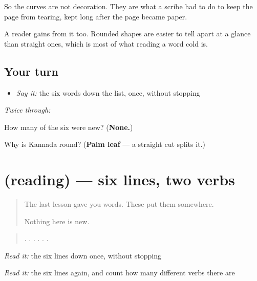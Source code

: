 So the curves are not decoration. They are what a scribe had to do to keep the page from tearing, kept long after the page became paper.

A reader gains from it too. Rounded shapes are easier to tell apart at a glance than straight ones, which is most of what reading a word cold is.

\subsection*{Your turn}
\begin{itemize}
\raggedright
  \item \emph{Say it:} the six words down the list, once, without stopping
\end{itemize}

\emph{Twice through:}

\begin{tcolorbox}[breakable,colback=teal!4,colframe=teal!35!black,title={Before you move on}]
How many of the six were new? (\textbf{None.})

Why is Kannada round? (\textbf{Palm leaf} — a straight cut splits it.)
\end{tcolorbox}
\section[(reading)]{(reading) — six lines, two verbs}

\label{lesson:KA-C76-lines}



\begin{quote}
The last lesson gave you words. These put them somewhere.

Nothing here is new.
\end{quote}

\begin{tcolorbox}[breakable,skin=enhanced,colback=orange!6,colframe=orange!45!black,boxrule=0.5pt,arc=1mm,left=6pt,right=6pt,top=4pt,bottom=4pt,fonttitle=\bfseries,title={Read this}]
\begin{quote}
 .  .   .   . . .
\end{quote}

\emph{Read it:} the six lines down once, without stopping

\emph{Read it:} the six lines again, and count how many different verbs there are
\end{tcolorbox}

